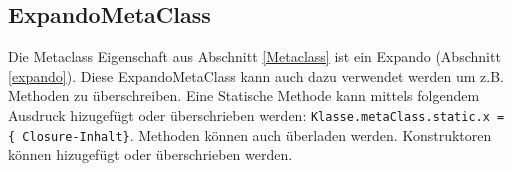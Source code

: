 \documentclass[11pt,english,ngerman, headsepline]{scrreprt}
\begin{document}
\subsection{ExpandoMetaClass}

Die Metaclass Eigenschaft aus Abschnitt \ref{Metaclass} ist ein Expando
(Abschnitt \ref{expando}).
Diese ExpandoMetaClass kann auch dazu verwendet werden um z.B. Methoden zu
überschreiben. Eine Statische Methode kann mittels folgendem Ausdruck hizugefügt
oder überschrieben werden: \texttt{Klasse.metaClass.static.x = \{
Closure-Inhalt\}}. 
Methoden können auch überladen werden. Konstruktoren können hizugefügt oder
überschrieben werden. 
 




% 
\end{document}
